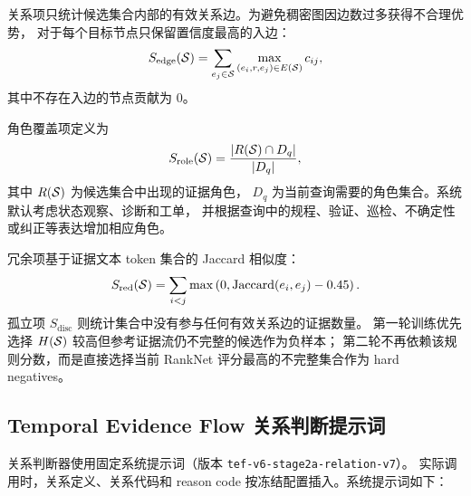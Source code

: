 关系项只统计候选集合内部的有效关系边。为避免稠密图因边数过多获得不合理优势，
对于每个目标节点只保留置信度最高的入边：
\begin{equation}
S_{\mathrm{edge}}(\mathcal{S})
=
\sum_{e_j\in\mathcal{S}}
\max_{(e_i,r,e_j)\in E(\mathcal{S})}c_{ij},
\end{equation}
其中不存在入边的节点贡献为 0。

角色覆盖项定义为
\begin{equation}
S_{\mathrm{role}}(\mathcal{S})
=
\frac{|R(\mathcal{S})\cap D_q|}{|D_q|},
\end{equation}
其中 $R(\mathcal{S})$ 为候选集合中出现的证据角色，
$D_q$ 为当前查询需要的角色集合。系统默认考虑状态观察、诊断和工单，
并根据查询中的规程、验证、巡检、不确定性或纠正等表达增加相应角色。

冗余项基于证据文本 token 集合的 Jaccard 相似度：
\begin{equation}
S_{\mathrm{red}}(\mathcal{S})
=
\sum_{i<j}
\max\left(
0,
\operatorname{Jaccard}(e_i,e_j)-0.45
\right).
\end{equation}
孤立项 $S_{\mathrm{disc}}$ 则统计集合中没有参与任何有效关系边的证据数量。
第一轮训练优先选择 $H(\mathcal{S})$ 较高但参考证据流仍不完整的候选作为负样本；
第二轮不再依赖该规则分数，而是直接选择当前 RankNet 评分最高的不完整集合作为 hard negatives。

\subsection{Temporal Evidence Flow 关系判断提示词}
\label{app:relation_prompt}

关系判断器使用固定系统提示词（版本 \texttt{tef-v6-stage2a-relation-v7}）。
实际调用时，关系定义、关系代码和 reason code 按冻结配置插入。系统提示词如下：


